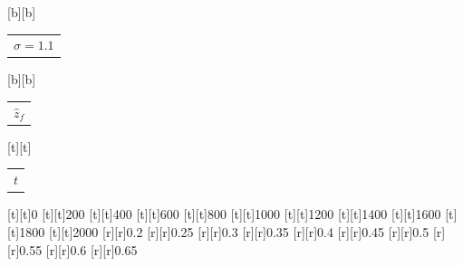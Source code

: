 %
\begin{psfrags}%
\psfragscanon%
%
[b][b]{\fontsize{11}{16.5}\selectfont \color[rgb]{0,0,0}\setlength{\tabcolsep}{0pt}\begin{tabular}{c}$\sigma=1.1$\end{tabular}}%
[b][b]{\fontsize{11}{16.5}\selectfont \color[rgb]{0.15,0.15,0.15}\setlength{\tabcolsep}{0pt}\begin{tabular}{c}$\hat{z}_f$\end{tabular}}%
[t][t]{\fontsize{11}{16.5}\selectfont \color[rgb]{0.15,0.15,0.15}\setlength{\tabcolsep}{0pt}\begin{tabular}{c}$t$\end{tabular}}%
%
\color[rgb]{0.15,0.15,0.15}%
%
\fontsize{10}{15}%
\selectfont%
%
[t][t]{0}%
[t][t]{200}%
[t][t]{400}%
[t][t]{600}%
[t][t]{800}%
[t][t]{1000}%
[t][t]{1200}%
[t][t]{1400}%
[t][t]{1600}%
[t][t]{1800}%
[t][t]{2000}%
%
[r][r]{0.2}%
[r][r]{0.25}%
[r][r]{0.3}%
[r][r]{0.35}%
[r][r]{0.4}%
[r][r]{0.45}%
[r][r]{0.5}%
[r][r]{0.55}%
[r][r]{0.6}%
[r][r]{0.65}%
%
%
\end{psfrags}%
%
